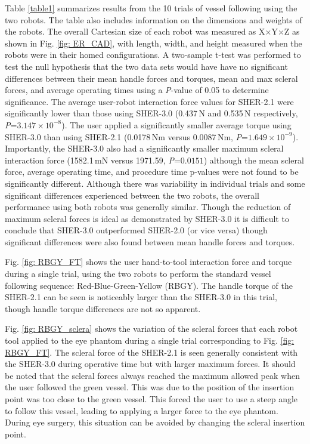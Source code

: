 \documentclass[letterpaper, 10 pt, conference]{ieeeconf}  %
\begin{document}
Table \ref{table1} summarizes results from the 10 trials of vessel following using the two robots. The table also includes information on the dimensions and weights of the robots. The overall Cartesian size of each robot was measured as X$\times$Y$\times$Z as shown in Fig. \ref{fig: ER_CAD}, with length, width, and height measured when the robots were in their homed configurations.
A two-sample t-test was performed to test the null hypothesis that the two data sets would have have no significant differences between their mean handle forces and torques, mean and max scleral forces, and average operating times \cite{montgomery2017design} using a \emph{P}-value of 0.05 to determine significance. The average user-robot interaction force values for SHER-2.1 were significantly lower than those using SHER-3.0 (0.437\,N and 0.535\,N respectively, \emph{P}=$3.147\times10^{-8}$). The user applied a significantly smaller average torque using SHER-3.0 than using SHER-2.1 (0.0178\,Nm versus 0.0087\,Nm, \emph{P}=$1.649\times10^{-9}$).
Importantly, the SHER-3.0 also had a significantly smaller maximum scleral interaction force (1582.1\,mN versus 1971.59, \emph{P}=$0.0151$) although the mean scleral force, average operating time, and procedure time p-values were not found to be significantly different. Although there was variability in individual trials and some significant differences experienced between the two robots, the overall performance using both robots was generally similar. Though the reduction of maximum scleral forces is ideal as demonstrated by SHER-3.0 it is difficult to conclude that SHER-3.0 outperformed SHER-2.0 (or vice versa) though significant differences were also found between mean handle forces and torques.

Fig. \ref{fig: RBGY_FT} shows the user hand-to-tool interaction force and torque during a single trial, using the two robots to perform the standard vessel following sequence: Red-Blue-Green-Yellow (RBGY). The handle torque of the SHER-2.1 can be seen is noticeably larger than the SHER-3.0 in this trial, though handle torque differences are not so apparent. 

Fig. \ref{fig: RBGY_sclera} shows the variation of the scleral forces that each robot tool applied to the eye phantom during a single trial corresponding to Fig. \ref{fig: RBGY_FT}. The scleral force of the SHER-2.1 is seen generally consistent with the SHER-3.0 during operative time but with larger maximum forces. It should be noted that the scleral forces always reached the maximum allowed peak when the user followed the green vessel. This was due to the position of the insertion point was too close to the green vessel. This forced the user to use a steep angle to follow this vessel, leading to applying a larger force to the eye phantom. During eye surgery, this situation can be avoided by changing the scleral insertion point.
\end{document}
